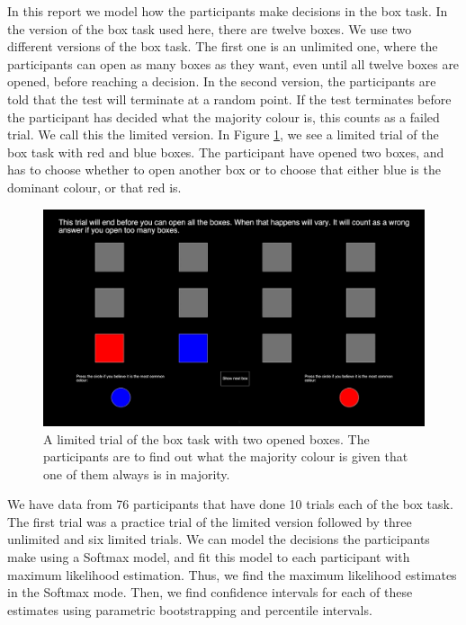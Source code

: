 In this report we model how the participants make decisions in the box task. In the version of the box task used here, there are twelve boxes. We use two different versions of the box task. The first one is an unlimited one, where the participants can open as many boxes as they want, even until all twelve boxes are opened, before reaching a decision. In the second version, the participants are told that the test will terminate at a random point. If the test terminates before the participant has decided what the majority colour is, this counts as a failed trial. We call this the limited version. In Figure \ref{picture_of_box_task}, we see a limited trial of the box task with red and blue boxes. The participant have opened two boxes, and has to choose whether to open another box or to choose that either blue is the dominant colour, or that red is. 

\begin{figure}
    \centering
    \includegraphics[scale=0.486]{Sections/Box task 2.png}
    \caption[A Limited Trial of the Box Task Visualised]{A limited trial of the box task with two opened boxes. The participants are to find out what the majority colour is given that one of them always is in majority.}
    \label{picture_of_box_task}
\end{figure}

We have data from 76 participants that have done 10 trials each of the box task. The first trial was a practice trial of the limited version followed by three unlimited and six limited trials. We can model the decisions the participants make using a Softmax model, and fit this model to each participant with maximum likelihood estimation. Thus, we find the maximum likelihood estimates in the Softmax mode. Then, we find confidence intervals for each of these estimates using parametric bootstrapping and percentile intervals. 

